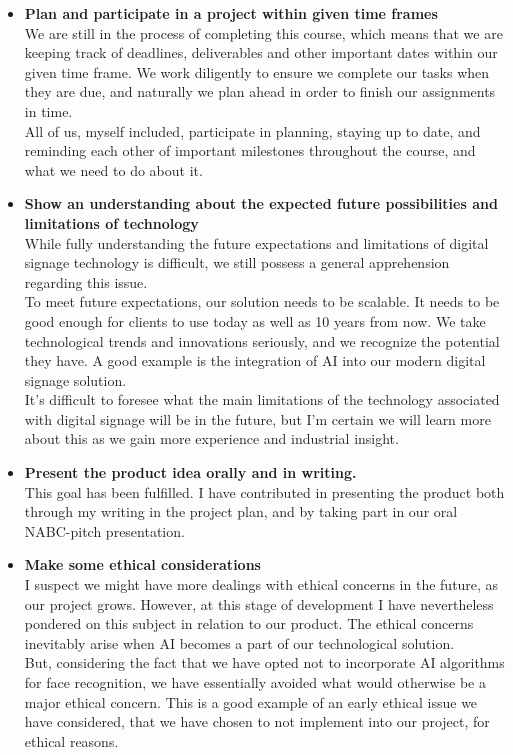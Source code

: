 \documentclass{exam}
\begin{document}
\begin{itemize}
\item \textbf{Plan and participate in a project within given time frames}\\
\bigskip
We are still in the process of completing this course, which means that we are keeping track of deadlines, deliverables and other important dates within our given time frame. We work diligently to ensure we complete our tasks when they are due, and naturally we plan ahead in order to finish our assignments in time.\\
\bigskip
All of us, myself included, participate in planning, staying up to date, and reminding each other of important milestones throughout the course, and what we need to do about it.

\item \textbf{Show an understanding about the expected future possibilities and limitations of technology}\\
\bigskip
While fully understanding the future expectations and limitations of digital signage technology is difficult, we still possess a general apprehension regarding this issue.\\
\bigskip
To meet future expectations, our solution needs to be scalable. It needs to be good enough for clients to use today as well as 10 years from now. We take technological trends and innovations seriously, and we recognize the potential they have. A good example is the integration of AI into our modern digital signage solution.\\
\bigskip
It's difficult to foresee what the main limitations of the technology associated with digital signage will be in the future, but I'm certain we will learn more about this as we gain more experience and industrial insight.\\
\bigskip

\item \textbf{Present the product idea orally and in writing.}\\
\bigskip
This goal has been fulfilled. I have contributed in presenting the product both through my writing in the project plan, and by taking part in our oral NABC-pitch presentation.\\
\bigskip

\item \textbf{Make some ethical considerations}\\
\bigskip
I suspect we might have more dealings with ethical concerns in the future, as our project grows. However, at this stage of development I have nevertheless pondered on this subject in relation to our product. The ethical concerns inevitably arise when AI becomes a part of our technological solution.\\
\bigskip
But, considering the fact that we have opted not to incorporate AI algorithms for face recognition, we have essentially avoided what would otherwise be a major ethical concern. This is a good example of an early ethical issue we have considered, that we have chosen to not implement into our project, for ethical reasons.\\
\end{itemize}
\end{document}
